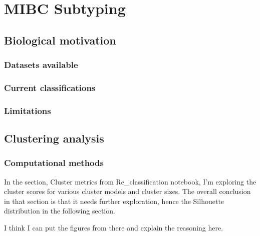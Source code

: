 \section{MIBC Subtyping}

\subsection{Biological motivation}
\subsubsection{Datasets available}
\subsubsection{Current classifications}
\subsubsection{Limitations}

\subsection{Clustering analysis}

\subsubsection{Computational methods}

In the section, Cluster metrics from Re\_classification notebook, I'm exploring the cluster scores for various cluster models and cluster sizes. The overall conclusion in that section is that it needs further exploration, hence the Silhouette distribution in the following section.

I think I can put the figures from there and explain the reasoning here.

